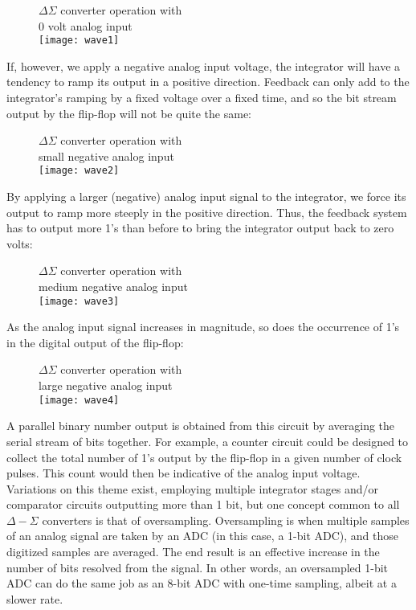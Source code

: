 \begin{figure}[!h]
\centering
$\Delta\Sigma$ converter operation with\\ 0 volt analog input\\
\texttt{[image: wave1]}
\end{figure}

If, however, we apply a negative analog input voltage, the integrator will
have a tendency to ramp its output in a positive direction. Feedback can
only add to the integrator's ramping by a fixed voltage over a fixed time,
and so the bit stream output by the flip-flop will not be quite the same: 

\begin{figure}[!h]
\centering
$\Delta\Sigma$ converter operation with\\ small negative analog input\\
\texttt{[image: wave2]}
\end{figure}

By applying a larger (negative) analog input signal to the integrator,
we force its output to ramp more steeply in the positive direction. Thus,
the feedback system has to output more 1's than before to bring the
integrator output back to zero volts: 

\begin{figure}[!h]
\centering
$\Delta\Sigma$ converter operation with\\ medium negative analog input\\
\texttt{[image: wave3]}
\end{figure}

As the analog input signal increases in magnitude, so does the occurrence
of 1's in the digital output of the flip-flop: 

\begin{figure}[!h]
\centering
$\Delta\Sigma$ converter operation with\\ large negative analog input\\
\texttt{[image: wave4]}
\end{figure}

A parallel binary number output is obtained from this circuit by averaging
the serial stream of bits together. For example, a counter circuit could be
designed to collect the total number of 1's output by the flip-flop in a
given number of clock pulses. This count would then be indicative of the
analog input voltage. Variations on this theme exist, employing multiple
integrator stages and/or comparator circuits outputting more than 1 bit,
but one concept common to all $\Delta-\Sigma$ converters is that of
oversampling. Oversampling is when multiple samples of an analog signal are
taken by an ADC (in this case, a 1-bit ADC), and those digitized samples are
averaged. The end result is an effective increase in the number of bits
resolved from the signal. In other words, an oversampled 1-bit ADC can do
the same job as an 8-bit ADC with one-time sampling, albeit at a slower rate. 
\rm
